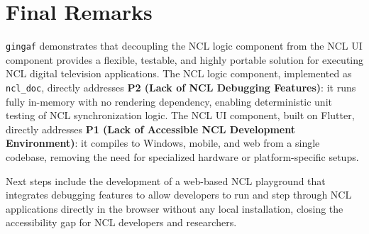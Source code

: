 \documentclass[sigconf,authorversion,review,authordraft]{acmart}
\newcommand{\projectname}{\texttt{gingaf}}
\begin{document}
\section{Final Remarks}

\projectname{} demonstrates that decoupling the NCL logic component from the NCL UI component provides a flexible, testable, and highly portable solution for executing NCL digital television applications. The NCL logic component, implemented as \texttt{ncl\_doc}, directly addresses \textbf{P2 (Lack of NCL Debugging Features)}: it runs fully in-memory with no rendering dependency, enabling deterministic unit testing of NCL synchronization logic. The NCL UI component, built on Flutter, directly addresses \textbf{P1 (Lack of Accessible NCL Development Environment)}: it compiles to Windows, mobile, and web from a single codebase, removing the need for specialized hardware or platform-specific setups.

Next steps include the development of a web-based NCL playground that integrates debugging features to allow developers to run and step through NCL applications directly in the browser without any local installation, closing the accessibility gap for NCL developers and researchers.




\appendix
\end{document}
